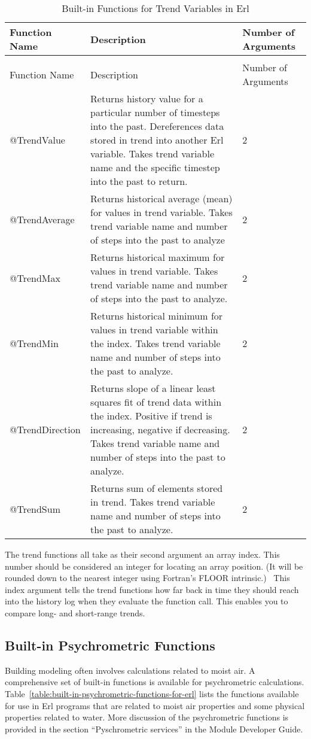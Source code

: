 \begin{longtable}[c]{p{1.5in}p{3.0in}p{1.5in}}
\caption{Built-in Functions for Trend Variables in Erl \label{table:built-in-functions-for-trend-variables-in-erl}} \tabularnewline
\toprule
Function Name & Description & Number of Arguments \tabularnewline
\midrule
\endfirsthead

\caption[]{Built-in Functions for Trend Variables in Erl} \tabularnewline
\toprule
Function Name & Description & Number of Arguments \tabularnewline
\midrule
\endhead

@TrendValue & Returns history value for a particular number of timesteps into the past. Dereferences data stored in trend into another Erl variable. Takes trend variable name and the specific timestep into the past to return. & 2 \tabularnewline
@TrendAverage & Returns historical average (mean) for values in trend variable. Takes trend variable name and number of steps into the past to analyze & 2 \tabularnewline
@TrendMax & Returns historical maximum for values in trend variable. Takes trend variable name and number of steps into the past to analyze. & 2 \tabularnewline
@TrendMin & Returns historical minimum for values in trend variable within the index. Takes trend variable name and number of steps into the past to analyze. & 2 \tabularnewline
@TrendDirection & Returns slope of a linear least squares fit of trend data within the index. Positive if trend is increasing, negative if decreasing. Takes trend variable name and number of steps into the past to analyze. & 2 \tabularnewline
@TrendSum & Returns sum of elements stored in trend. Takes trend variable name and number of steps into the past to analyze. & 2 \tabularnewline
\bottomrule
\end{longtable}

The trend functions all take as their second argument an array index. This number should be considered an integer for locating an array position. (It will be rounded down to the nearest integer using Fortran's FLOOR intrinsic.)~ This index argument tells the trend functions how far back in time they should reach into the history log when they evaluate the function call. This enables you to compare long- and short-range trends.

\subsection{Built-in Psychrometric Functions}\label{built-in-psychrometric-functions}

Building modeling often involves calculations related to moist air. A comprehensive set of built-in functions is available for psychrometric calculations. Table~\ref{table:built-in-psychrometric-functions-for-erl} lists the functions available for use in Erl programs that are related to moist air properties and some physical properties related to water. More discussion of the psychrometric functions is provided in the section ``Pyschrometric services'' in the Module Developer Guide.


